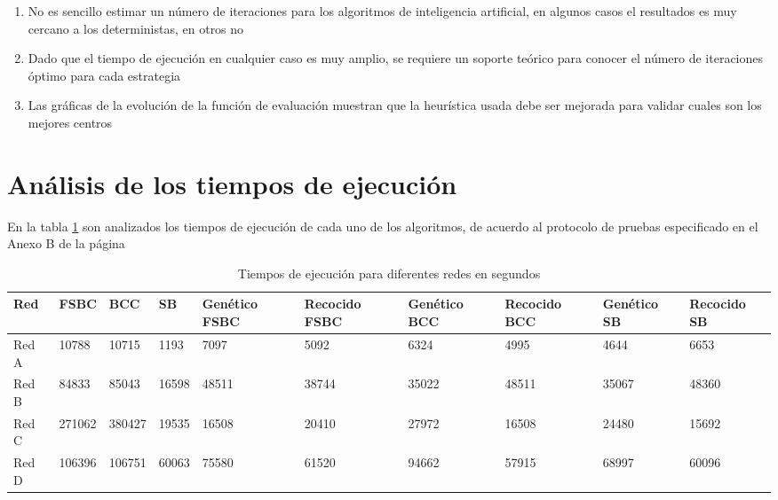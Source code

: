 \begin{enumerate}
    \item No es sencillo estimar un número de iteraciones para los algoritmos de inteligencia artificial, en algunos casos el resultados es muy cercano a los deterministas, en otros no
    \item Dado que el tiempo de ejecución en cualquier caso es muy amplio, se requiere un soporte teórico para conocer el número de iteraciones óptimo para cada estrategia
    \item Las gráficas de la evolución de la función de evaluación muestran que la heurística usada debe ser mejorada para validar cuales son los mejores centros
\end{enumerate}

\section{Análisis de los tiempos de ejecución}

En la tabla \ref{tab:executionTimes} son analizados los tiempos de ejecución de cada uno de los algoritmos, de acuerdo al protocolo de pruebas especificado en el Anexo B de la página \pageref{AnexoB}

\begin{table}[H]
    \centering
    \begin{tabular}{|p{1cm}|p{1cm}|p{1.1cm}|p{1cm}|p{1.5cm}|p{1.5cm}|p{1.5cm}|p{1.5cm}|p{1.5cm}|p{1.5cm}|}
         \hline
         \textbf{Red} & \textbf{FSBC} & \textbf{BCC} & \textbf{SB} & \textbf{Genético FSBC} & \textbf{Recocido FSBC} &
         \textbf{Genético BCC} & \textbf{Recocido BCC} &
         \textbf{Genético SB} & \textbf{Recocido SB} \\
         \hline
         Red A & 10788 & 10715 & 1193 & 7097 & 5092 & 6324 & 4995 &4644 & 6653 \\
         \hline
         Red B & 84833 & 85043  & 16598  & 48511  & 38744  &  35022 & 48511 & 35067 & 48360  \\
         \hline
         Red C & 271062 & 380427 & 19535  &  16508 & 20410  &  27972 & 16508 & 24480 & 15692  \\
         \hline
         Red D & 106396 & 106751 &  60063 & 75580  & 61520  & 94662  & 57915  & 68997 &  60096 \\
         \hline
    \end{tabular}
    \caption{Tiempos de ejecución para diferentes redes en segundos}
    \label{tab:executionTimes}
\end{table}

